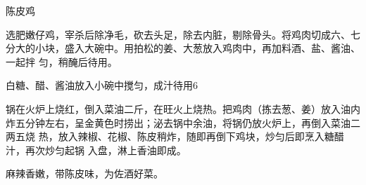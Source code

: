 \begin{recipe}{陈皮鸡}

\ingredients


\cooking

\step 选肥嫩仔鸡，宰杀后除净毛，砍去头足，除去内脏，剔除骨头。将鸡肉切成六、七
分大的小块，盛入大碗中。用拍松的姜、大葱放入鸡肉中，再加料酒、盐、酱油、一起拌
匀，稍醃后待用。

\step 白糖、醋、酱油放入小碗中搅匀，成汁待用6

\step 锅在火炉上烧红，倒入菜油二斤，在旺火上烧热。把鸡肉（拣去葱、姜）放入油内
炸五分钟左右，呈金黄色时捞出；泌去锅中余油，将锅仍放火炉上，再倒入菜油二两五烧
热，放入辣椒、花椒、陈皮稍炸，随即再倒下鸡块，炒匀后即烹入糖醋汁，再次炒匀起锅
入盘，淋上香油即成。

\features

麻辣香嫩，带陈皮味，为佐酒好菜。

\end{recipe}

